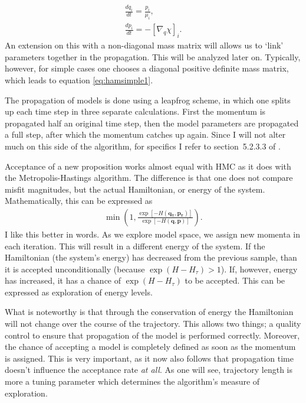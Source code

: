 \begin{gather}
\frac{d q_i}{dt} = \frac{p_i}{\mu_i},\label{eq:hamsimple1}\\
\frac{d p_i}{dt} = - \left[\nabla_{q} \chi \right]_i\label{eq:hamsimple2}.
\end{gather}
An extension on this with a non-diagonal mass matrix will allows us to `link' parameters together in the propagation. This will be analyzed later on. Typically, however, for simple cases one chooses a diagonal positive definite mass matrix, which leads to equation \eqref{eq:hamsimple1}.

The propagation of models is done using a leapfrog scheme, in which one splits up each time step in three separate calculations. First the momentum is propagated half an original time step, then the model parameters are propagated a full step, after which the momentum catches up again. Since I will not alter much on this side of the algorithm, for specifics I refer to section~5.2.3.3 of \cite{neal2011mcmc}.

Acceptance of a new proposition works almost equal with \gls{HMC} as it does with the Metropolis-Hastings algorithm. The difference is that one does not compare misfit magnitudes, but the actual Hamiltonian, or energy of the system. Mathematically, this can be expressed as
\begin{gather}
	\min\left( 1, \frac{\exp\left[-H(\mathbf{q_\tau},\mathbf{p_\tau}) \right]}{\exp\left[-H(\mathbf{q},\mathbf{p}) \right]} \right).
\end{gather}
I like this better in words. As we explore model space, we assign new momenta in each iteration. This will result in a different energy of the system. If the Hamiltonian (the system's energy) has decreased from the previous sample, than it is accepted unconditionally (because $\exp (H - H_\tau)>1$). If, however, energy has increased, it has a chance of $\exp \left(H - H_\tau\right)$ to be accepted. This can be expressed as exploration of energy levels.

What is noteworthy is that through the conservation of energy the Hamiltonian will not change over the course of the trajectory. This allows two things; a quality control to ensure that propagation of the model is performed correctly. Moreover, the chance of accepting a model is completely defined as soon as the momentum is assigned. This is very important, as it now also follows that propagation time doesn't influence the acceptance rate \textit{at all}. As one will see, trajectory length is more a tuning parameter which determines the algorithm's measure of exploration.

